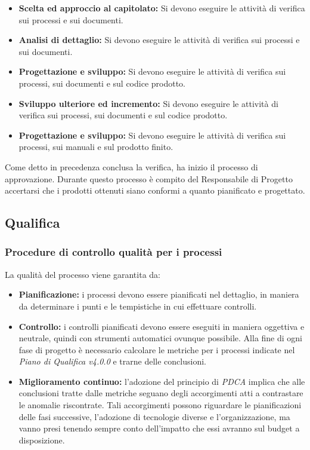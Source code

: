 \documentclass[a4paper]{article}
\begin{document}
			\begin{itemize}
				\item \textbf{Scelta ed approccio al capitolato:} Si devono eseguire le attività di verifica sui processi e sui documenti.
				
				\item \textbf{Analisi di dettaglio:} Si devono eseguire le attività di verifica sui processi e sui documenti.
				
				\item \textbf{Progettazione e sviluppo:} Si devono eseguire le attività di verifica sui processi, sui documenti e sul codice prodotto.
				
				\item \textbf{Sviluppo ulteriore ed incremento:} Si devono eseguire le attività di verifica sui processi, sui documenti e sul codice prodotto.
				
				\item \textbf{Progettazione e sviluppo:} Si devono eseguire le attività di verifica sui processi, sui manuali e sul prodotto finito.
			\end{itemize}
			
			
			Come detto in precedenza conclusa la verifica, ha inizio il processo di approvazione. Durante questo processo è compito 
			del Responsabile di Progetto accertarsi che i prodotti ottenuti siano conformi a quanto pianificato e progettato.
			
				\subsection{Qualifica}
		\subsubsection{Procedure di controllo qualità per i processi}
			La qualità del processo viene garantita da:
			\begin{itemize}
				\item \textbf{Pianificazione:} i processi devono essere pianificati nel dettaglio, in maniera da determinare 
				i punti e le tempistiche in cui effettuare controlli. 
				\item \textbf{Controllo:} i controlli pianificati devono essere eseguiti in maniera oggettiva e neutrale, 
				quindi con strumenti automatici ovunque possibile. Alla fine di ogni fase di progetto è necessario calcolare
				le metriche per i processi indicate nel \emph{Piano di Qualifica v4.0.0} e trarne delle conclusioni. 
				\item \textbf{Miglioramento continuo:} l'adozione del principio di \emph{PDCA} implica che alle conclusioni
				tratte dalle metriche seguano degli accorgimenti atti a contrastare le anomalie riscontrate. Tali accorgimenti
				possono riguardare le pianificazioni delle fasi successive, l'adozione di tecnologie diverse e l'organizzazione,
				ma vanno presi tenendo sempre conto dell'impatto che essi avranno sul budget a disposizione.
			\end{itemize}
			
\end{document}
